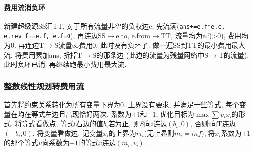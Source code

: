 \paragraph{费用流消负环}
新建超级源SS汇TT, 对于所有流量非空的负权边e, 先流满(\texttt{ans+=e.f*e.c, e.rev.f+=e.f, e.f=0}), 再连边SS$\to$e.to, e.from$\to$TT, 流量均为e.f(>0), 费用均为0. 再连边T$\to$S流量$\infty$费用0. 此时没有负环了. 做一遍SS到TT的最小费用最大流, 将费用累加ans, 拆掉T$\to$S的那条边 (此边的流量为残量网络中S$\to$T的流量). 此时负环已消, 再继续跑最小费用最大流.

\subsubsection*{整数线性规划转费用流}
\noindent
首先将约束关系转化为所有变量下界为$0$, 上界没有要求, 并满足一些等式,
每个变量在均在等式左边且出现恰好两次, 系数为$+1$和$-1$, 优化目标为$\max\sum v_ix_i$的形式.
将等式看做点, 等式i右边的值$b_i$若为正, 则$S$向$i$连边$(b_i, 0)$, 否则i向T连边$(-b_i, 0)$.
将变量看做边, 记变量$x_i$的上界为$m_i$(无上界则$m_i=inf$), 将$x_i$系数为$+1$的那个等式$u$向系数为$-1$的等式$v$连边$(m_i, v_i)$.
